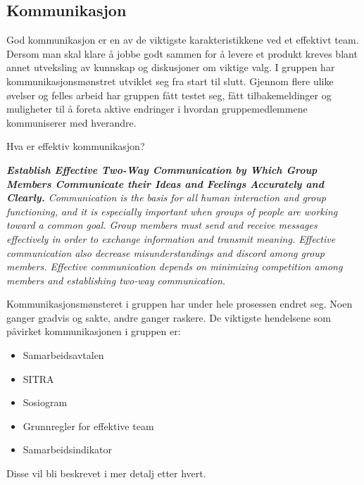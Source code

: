 \subsection{Kommunikasjon}


God kommunikasjon er en av de viktigste karakteristikkene ved et effektivt team.
Dersom man skal klare å jobbe godt sammen for å levere et produkt kreves blant annet utveksling av kunnskap og diskusjoner om viktige valg.
I gruppen har kommunikasjonsmønstret utviklet seg fra start til slutt.
Gjennom flere ulike øvelser og felles arbeid har gruppen fått testet seg, fått tilbakemeldinger og muligheter til å foreta aktive endringer i hvordan gruppemedlemmene kommuniserer med hverandre.

Hva er effektiv kommunikasjon?

\textit{
\textbf{
Establish Effective Two-Way Communication by Which Group Members Communicate their Ideas and Feelings Accurately and Clearly.
}
Communication is the basis for all human interaction and group functioning, and it is especially important when groups of people are working toward a common goal.
Group members must send and receive messages effectively in order to exchange information and transmit meaning.
Effective communication also decrease misunderstandings and discord among group members.
Effective communication depends on minimizing competition among members and establishing two-way communication.
}
\cite{group_dynamics}

Kommunikasjonsmønsteret i gruppen har under hele prosessen endret seg.
Noen ganger gradvis og sakte, andre ganger raskere.
De viktigste hendelsene som påvirket kommunikasjonen i gruppen er:

\begin{itemize}
\item Samarbeidsavtalen
\item SITRA
\item Sosiogram
\item Grunnregler for effektive team
\item Samarbeidsindikator
\end{itemize}
Disse vil bli beskrevet i mer detalj etter hvert.

